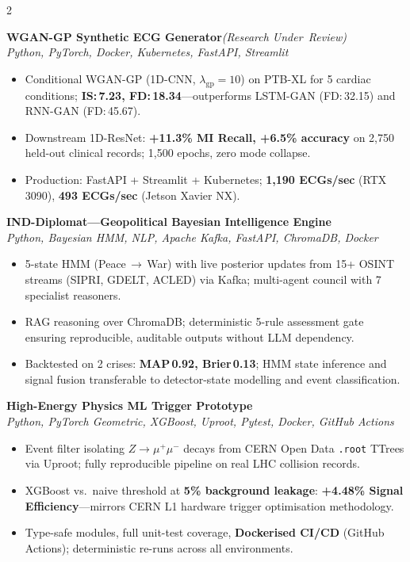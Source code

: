 \documentclass[10pt,a4paper]{extarticle}
\begin{document}
\begin{paracol}{2}
\begin{rightcolumn}
{\small
\textbf{WGAN-GP Synthetic ECG Generator}\;\textit{\color{subtlegray}(Research Under~Review)}\hfill{\href{https://github.com/ABHISHEK1139/wgan-ecg-generator}{\color{accent}\faGithub}}\\
\textit{\color{subtlegray}Python, PyTorch, Docker, Kubernetes, FastAPI, Streamlit}
\begin{itemize}
  \item Conditional WGAN-GP (1D-CNN, $\lambda_{\mathrm{gp}}\!=\!10$) on PTB-XL for 5 cardiac conditions; \textbf{IS:\,7.23, FD:\,18.34}\;---\;outperforms LSTM-GAN (FD:\,32.15) and RNN-GAN (FD:\,45.67).
  \item Downstream 1D-ResNet: \textbf{+11.3\% MI Recall, +6.5\% accuracy} on 2,750 held-out clinical records; 1,500 epochs, zero mode collapse.
  \item Production: FastAPI + Streamlit + Kubernetes; \textbf{1,190 ECGs/sec} (RTX 3090), \textbf{493 ECGs/sec} (Jetson Xavier NX).
\end{itemize}
}

\vspace{2pt}
{\small
\textbf{IND-Diplomat\;---\;Geopolitical Bayesian Intelligence Engine}\hfill{\href{https://github.com/ABHISHEK1139/IND-Diplomat}{\color{accent}\faGithub}}\\
\textit{\color{subtlegray}Python, Bayesian HMM, NLP, Apache Kafka, FastAPI, ChromaDB, Docker}
\begin{itemize}
  \item 5-state HMM (Peace\,$\to$\,War) with live posterior updates from 15+ OSINT streams (SIPRI, GDELT, ACLED) via Kafka; multi-agent council with 7 specialist reasoners.
  \item RAG reasoning over ChromaDB; deterministic 5-rule assessment gate ensuring reproducible, auditable outputs without LLM dependency.
  \item Backtested on 2 crises: \textbf{MAP\,0.92, Brier\,0.13}; HMM state inference and signal fusion transferable to detector-state modelling and event classification.
\end{itemize}
}

\vspace{2pt}
{\small
\textbf{High-Energy Physics ML Trigger Prototype}\hfill{\href{https://github.com/ABHISHEK1139/real-time-particle-event-filter}{\color{accent}\faGithub}}\\
\textit{\color{subtlegray}Python, PyTorch Geometric, XGBoost, Uproot, Pytest, Docker, GitHub Actions}
\begin{itemize}
  \item Event filter isolating $Z\!\to\!\mu^+\mu^-$ decays from CERN Open Data \texttt{.root} TTrees via Uproot; fully reproducible pipeline on real LHC collision records.
  \item XGBoost vs.\ naive threshold at \textbf{5\% background leakage}: \textbf{+4.48\% Signal Efficiency}\;---\;mirrors CERN L1 hardware trigger optimisation methodology.
  \item Type-safe modules, full unit-test coverage, \textbf{Dockerised CI/CD} (GitHub Actions); deterministic re-runs across all environments.
\end{itemize}
}


\end{rightcolumn}
\end{paracol}
\end{document}
